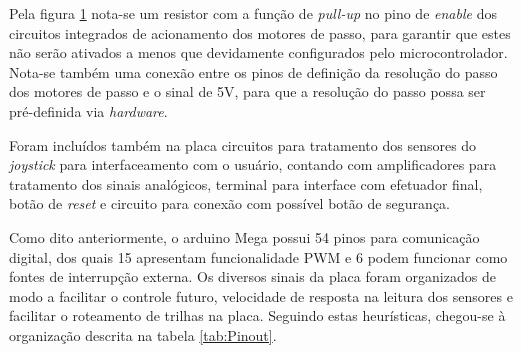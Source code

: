 \begin{figure}[h]
\begin{centering}
\begin{floatrow}
    \end{floatrow}

    \par\end{centering}

    \label{fig:MainPCB-Motors}
\end{figure}

Pela figura \ref{fig:MainPCB-Motors} nota-se um resistor com a 
função de \textit{pull-up} no pino de \textit{enable} dos circuitos integrados de acionamento
dos motores de passo, para garantir que estes não serão ativados a menos que devidamente 
configurados pelo microcontrolador. Nota-se também uma conexão entre 
os pinos de definição da resolução do passo dos motores de passo e o 
sinal de 5V, para que a resolução do passo possa ser pré-definida via
\textit{hardware}.

Foram incluídos também na placa circuitos para tratamento dos sensores 
do \textit{joystick} para interfaceamento com o usuário, contando 
com amplificadores para tratamento dos sinais analógicos, terminal para
interface com efetuador final, botão de \textit{reset} e circuito para
conexão com possível botão de segurança.

Como dito anteriormente, o arduino Mega possui 54 pinos para comunicação
digital, dos quais 15 apresentam funcionalidade PWM e 6 podem funcionar
como fontes de interrupção externa. Os diversos sinais da placa foram 
organizados de modo a facilitar o controle futuro, velocidade de resposta
na leitura dos sensores e facilitar o roteamento de trilhas na placa. 
Seguindo estas heurísticas, chegou-se à organização descrita na tabela
\ref{tab:Pinout}.

